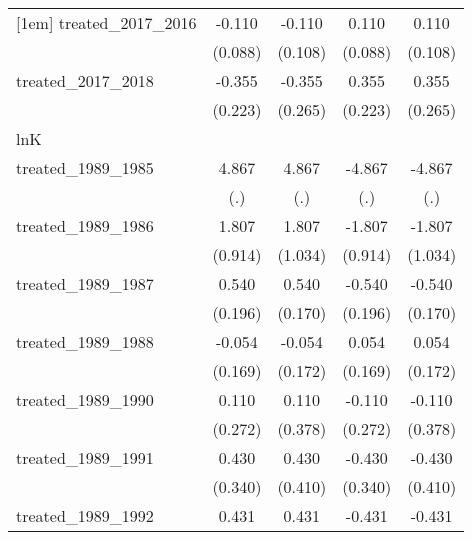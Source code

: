 {\begin{tabular}{l*{4}{c}}
[1em]
treated\_2017\_2016&      -0.110         &      -0.110         &       0.110         &       0.110         \\
            &     (0.088)         &     (0.108)         &     (0.088)         &     (0.108)         \\
[1em]
treated\_2017\_2018&      -0.355         &      -0.355         &       0.355         &       0.355         \\
            &     (0.223)         &     (0.265)         &     (0.223)         &     (0.265)         \\
\hline
lnK         &                     &                     &                     &                     \\
treated\_1989\_1985&       4.867         &       4.867         &      -4.867         &      -4.867         \\
            &         (.)         &         (.)         &         (.)         &         (.)         \\
[1em]
treated\_1989\_1986&       1.807\sym{*}  &       1.807         &      -1.807\sym{*}  &      -1.807         \\
            &     (0.914)         &     (1.034)         &     (0.914)         &     (1.034)         \\
[1em]
treated\_1989\_1987&       0.540\sym{**} &       0.540\sym{**} &      -0.540\sym{**} &      -0.540\sym{**} \\
            &     (0.196)         &     (0.170)         &     (0.196)         &     (0.170)         \\
[1em]
treated\_1989\_1988&      -0.054         &      -0.054         &       0.054         &       0.054         \\
            &     (0.169)         &     (0.172)         &     (0.169)         &     (0.172)         \\
[1em]
treated\_1989\_1990&       0.110         &       0.110         &      -0.110         &      -0.110         \\
            &     (0.272)         &     (0.378)         &     (0.272)         &     (0.378)         \\
[1em]
treated\_1989\_1991&       0.430         &       0.430         &      -0.430         &      -0.430         \\
            &     (0.340)         &     (0.410)         &     (0.340)         &     (0.410)         \\
[1em]
treated\_1989\_1992&       0.431         &       0.431         &      -0.431         &      -0.431         \\

\end{tabular}}
